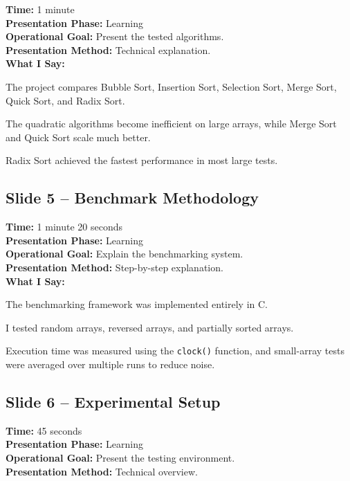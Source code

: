 \documentclass[12pt]{article}
\begin{document}
\textbf{Time:} 1 minute\\
\textbf{Presentation Phase:} Learning\\
\textbf{Operational Goal:} Present the tested algorithms.\\
\textbf{Presentation Method:} Technical explanation.\\

\textbf{What I Say:}

The project compares Bubble Sort, Insertion Sort, Selection Sort, Merge Sort, Quick Sort, and Radix Sort.

The quadratic algorithms become inefficient on large arrays, while Merge Sort and Quick Sort scale much better.

Radix Sort achieved the fastest performance in most large tests.

\vspace{0.4cm}

\subsection*{Slide 5 -- Benchmark Methodology}

\textbf{Time:} 1 minute 20 seconds\\
\textbf{Presentation Phase:} Learning\\
\textbf{Operational Goal:} Explain the benchmarking system.\\
\textbf{Presentation Method:} Step-by-step explanation.\\

\textbf{What I Say:}

The benchmarking framework was implemented entirely in C.

I tested random arrays, reversed arrays, and partially sorted arrays.

Execution time was measured using the \texttt{clock()} function, and small-array tests were averaged over multiple runs to reduce noise.

\vspace{0.4cm}

\subsection*{Slide 6 -- Experimental Setup}

\textbf{Time:} 45 seconds\\
\textbf{Presentation Phase:} Learning\\
\textbf{Operational Goal:} Present the testing environment.\\
\textbf{Presentation Method:} Technical overview.\\
\end{document}
